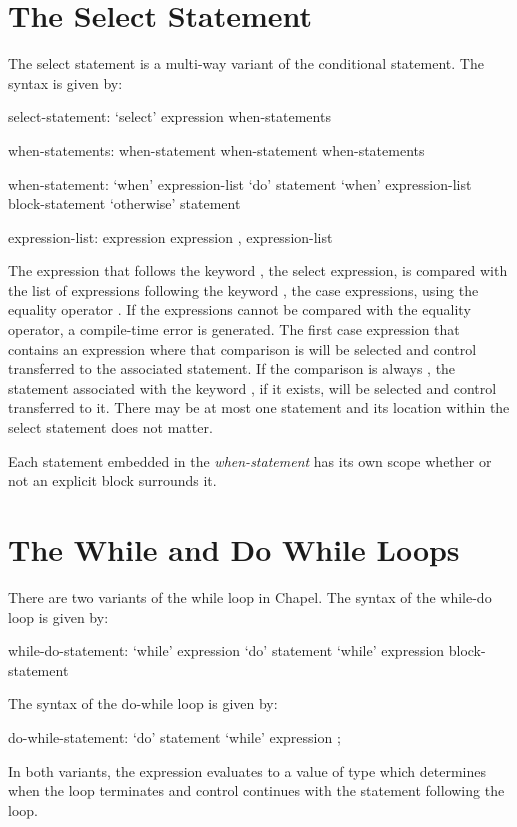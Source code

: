 \section{The Select Statement}
\label{The_Select_Statement}


The select statement is a multi-way variant of the conditional
statement.  The syntax is given by:
\begin{syntax}
select-statement:
  `select' expression { when-statements }

when-statements:
  when-statement
  when-statement when-statements

when-statement:
  `when' expression-list `do' statement
  `when' expression-list block-statement
  `otherwise' statement

expression-list:
  expression
  expression , expression-list
\end{syntax}
The expression that follows the keyword , the select
expression, is compared with the list of expressions following the
keyword , the case expressions, using the equality
operator \chpl{==}.  If the expressions cannot be compared with the
equality operator, a compile-time error is generated.  The first case
expression that contains an expression where that comparison
is  will be selected and control transferred to the
associated statement.  If the comparison is always , the
statement associated with the keyword , if it exists,
will be selected and control transferred to it.  There may be at most
one  statement and its location within the select
statement does not matter.

Each statement embedded in the {\em when-statement} has its own scope
whether or not an explicit block surrounds it.

\section{The While and Do While Loops}
\label{The_While_and_Do_While_Loops}


There are two variants of the while loop in Chapel.  The syntax of the
while-do loop is given by:
\begin{syntax}
while-do-statement:
  `while' expression `do' statement
  `while' expression block-statement
\end{syntax}
The syntax of the do-while loop is given by:
\begin{syntax}
do-while-statement:
  `do' statement `while' expression ;
\end{syntax}
In both variants, the expression evaluates to a value of type 
which determines when the loop terminates and control continues with
the statement following the loop.

